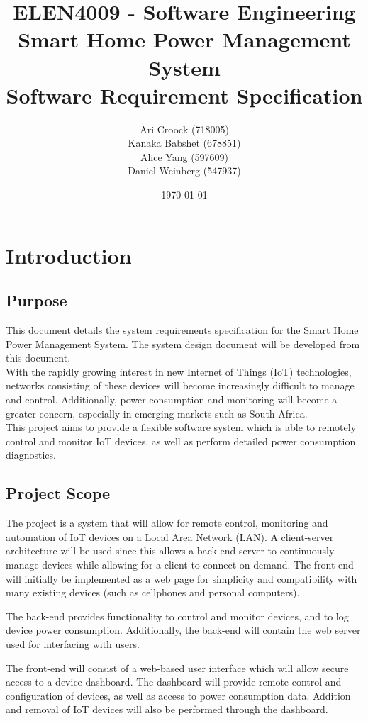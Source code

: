 \documentclass[11pt, a4paper]{article}
\title{ELEN4009 - Software Engineering\\Smart Home Power Management System\\Software Requirement Specification}
\author{Ari Croock (718005)\\Kanaka Babshet (678851)\\Alice Yang (597609)\\Daniel Weinberg (547937)}
\date{\today}
\begin{document}
	\maketitle
	\section{Introduction}
	\subsection{Purpose}
	This document details the system requirements specification for the Smart Home Power Management System. The system design document will be developed from this document.\\
	
	With the rapidly growing interest in new Internet of Things (IoT) technologies, networks consisting of these devices will become increasingly difficult to manage and control. Additionally, power consumption and monitoring will become a greater concern, especially in emerging markets such as South Africa.\\
	
	This project aims to provide a flexible software system which is able to remotely control and monitor IoT devices, as well as perform detailed power consumption diagnostics.
	
	\subsection{Project Scope}
	The project is a system that will allow for remote control, monitoring and automation of IoT devices on a Local Area Network (LAN). A client-server architecture will be used since this allows a back-end server to continuously manage devices while allowing for a client to connect on-demand. The front-end will initially be implemented as a web page for simplicity and compatibility with many existing devices (such as cellphones and personal computers).
	
	The back-end provides functionality to control and monitor devices, and to log device power consumption. Additionally, the back-end will contain the web server used for interfacing with users.
	
	The front-end will consist of a web-based user interface which will allow secure access to a device dashboard. The dashboard will provide remote control and configuration of devices, as well as access to power consumption data. Addition and removal of IoT devices will also be performed through the dashboard. 
	
\end{document}
